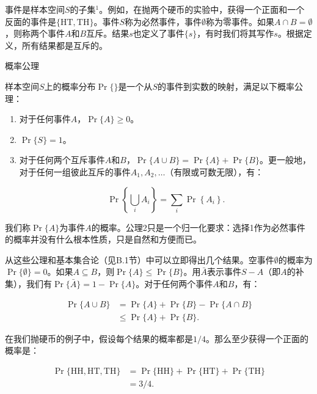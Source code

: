 \documentclass[lang=cn,newtx,10pt,scheme=chinese]{elegantbook}
\begin{document}
事件是样本空间$S$的子集${ }^1$。例如，在抛两个硬币的实验中，获得一个正面和一个反面的事件是$\{\mathrm{HT}, \mathrm{TH}\}$。事件$S$称为必然事件，事件$\emptyset$称为零事件。如果$A \cap B=\emptyset$，则称两个事件$A$和$B$互斥。结果$s$也定义了事件$\{s\}$，有时我们将其写作$s$。根据定义，所有结果都是互斥的。

概率公理

样本空间$S$上的概率分布$\operatorname{Pr}\{\}$是一个从$S$的事件到实数的映射，满足以下概率公理：

\begin{enumerate}
\item 对于任何事件$A$，$\operatorname{Pr}\{A\} \geq 0$。
\item $\operatorname{Pr}\{S\}=1$。
\item 对于任何两个互斥事件$A$和$B$，$\operatorname{Pr}\{A \cup B\}=\operatorname{Pr}\{A\}+\operatorname{Pr}\{B\}$。更一般地，对于任何一组彼此互斥的事件$A_1, A_2, \ldots$（有限或可数无限），有：

$$
\operatorname{Pr}\left\{\bigcup_i A_i\right\}=\sum_i \operatorname{Pr}\left\{A_i\right\} .
$$
\end{enumerate}

我们称$\operatorname{Pr}\{A\}$为事件$A$的概率。公理2只是一个归一化要求：选择1作为必然事件的概率并没有什么根本性质，只是自然和方便而已。

从这些公理和基本集合论（见B.1节）中可以立即得出几个结果。空事件$\emptyset$的概率为$\operatorname{Pr}\{\emptyset\} = 0$。如果$A \subseteq B$，则$\operatorname{Pr}\{A\} \leq \operatorname{Pr}\{B\}$。用$\bar{A}$表示事件$S-A$（即$A$的补集），我们有$\operatorname{Pr}\{\bar{A}\}=1-\operatorname{Pr}\{A\}$。对于任何两个事件$A$和$B$，有：

$$
\begin{aligned}
\operatorname{Pr}\{A \cup B\} & =\operatorname{Pr}\{A\}+\operatorname{Pr}\{B\}-\operatorname{Pr}\{A \cap B\} \\
& \leq \operatorname{Pr}\{A\}+\operatorname{Pr}\{B\} .
\end{aligned}
$$

在我们抛硬币的例子中，假设每个结果的概率都是$1/4$。那么至少获得一个正面的概率是：

$$
\begin{aligned}
\operatorname{Pr}\{\mathrm{HH}, \mathrm{HT}, \mathrm{TH}\} & =\operatorname{Pr}\{\mathrm{HH}\}+\operatorname{Pr}\{\mathrm{HT}\}+\operatorname{Pr}\{\mathrm{TH}\} \\
& =3 / 4 .
\end{aligned}
$$
\end{document}
